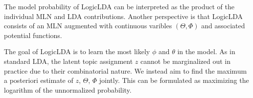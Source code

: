 The model probability of LogicLDA can be interpreted as the product of the individual MLN and LDA contributions. Another perspective is that LogicLDA consists of an MLN augmented with continuous varibles $(\Theta, \Phi)$ and associated potential functions.

The goal of LogicLDA is to learn the most likely $\phi$ and $\theta$ in the model. As in standard LDA, the latent topic assignment $z$ cannot be marginalized out in practice due to their combinatorial nature. We instead aim to find the maximum a posteriori estimate of $z$, $\Theta$, $\Phi$ jointly. This can be formulated as maximizing the logarithm of the unnormalized probability.